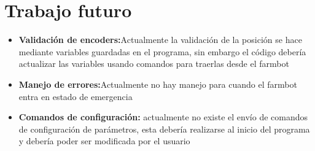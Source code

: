 \documentclass[letterpaper,12pt]{article}
\begin{document}
	\section{Trabajo futuro}
	\begin{itemize}
		\item \textbf{Validación de encoders:}Actualmente la validación de la posición se hace mediante variables guardadas en el programa, sin embargo el código debería actualizar las variables usando comandos para traerlas desde el farmbot 
		\item \textbf{Manejo de errores:}Actualmente no hay manejo para cuando el farmbot entra en estado de emergencia
		\item \textbf{Comandos de configuración:} actualmente no existe el envío de comandos de configuración de parámetros, esta debería realizarse al inicio del programa y debería poder ser modificada por el usuario
	\end{itemize}
\end{document}
